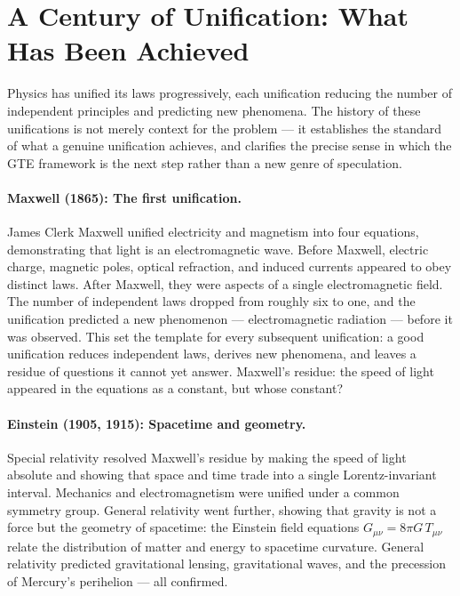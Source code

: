 \documentclass[11pt,openany]{book}
\theoremstyle{remark}
\begin{document}
\section{A Century of Unification: What Has Been Achieved}
\label{sec:history}

Physics has unified its laws progressively, each unification reducing the number of
independent principles and predicting new phenomena.
The history of these unifications is not merely context for the problem --- it
establishes the standard of what a genuine unification achieves, and clarifies the
precise sense in which the GTE framework is the next step rather than a new genre of
speculation.

\paragraph{Maxwell (1865): The first unification.}
James Clerk Maxwell unified electricity and magnetism into four equations, demonstrating
that light is an electromagnetic wave.
Before Maxwell, electric charge, magnetic poles, optical refraction, and induced currents
appeared to obey distinct laws.
After Maxwell, they were aspects of a single electromagnetic field.
The number of independent laws dropped from roughly six to one, and the unification
predicted a new phenomenon --- electromagnetic radiation --- before it was observed.
This set the template for every subsequent unification: a good unification reduces
independent laws, derives new phenomena, and leaves a residue of questions it cannot
yet answer.
Maxwell's residue: the speed of light appeared in the equations as a constant, but
whose constant?

\paragraph{Einstein (1905, 1915): Spacetime and geometry.}
Special relativity resolved Maxwell's residue by making the speed of light absolute
and showing that space and time trade into a single Lorentz-invariant interval.
Mechanics and electromagnetism were unified under a common symmetry group.
General relativity went further, showing that gravity is not a force but the geometry
of spacetime: the Einstein field equations $G_{\mu\nu} = 8\pi G\,T_{\mu\nu}$ relate
the distribution of matter and energy to spacetime curvature.
General relativity predicted gravitational lensing, gravitational waves, and the
precession of Mercury's perihelion --- all confirmed.
\end{document}

